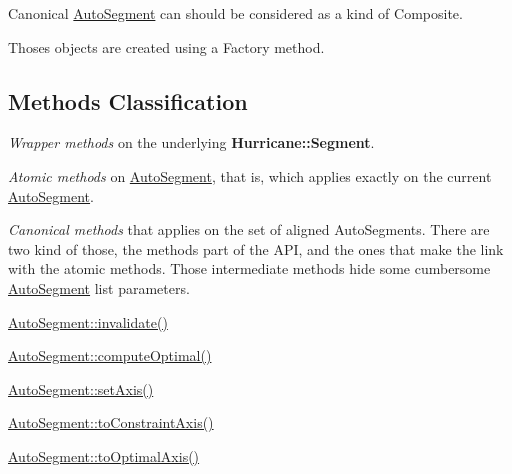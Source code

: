 Canonical \mbox{\hyperlink{classKatabatic_1_1AutoSegment}{Auto\+Segment}} can should be considered as a kind of Composite.

Thoses objects are created using a Factory method.\hypertarget{classKatabatic_1_1AutoSegment_secASMethodsClassif}{}\subsection{Methods Classification}\label{classKatabatic_1_1AutoSegment_secASMethodsClassif}

\begin{DoxyItemize}
\item {\itshape Wrapper methods} on the underlying \textbf{ Hurricane\+::\+Segment}. 
\end{DoxyItemize}
\begin{DoxyItemize}
\item {\itshape Atomic methods} on \mbox{\hyperlink{classKatabatic_1_1AutoSegment}{Auto\+Segment}}, that is, which applies exactly on the current \mbox{\hyperlink{classKatabatic_1_1AutoSegment}{Auto\+Segment}}. 
\end{DoxyItemize}
\begin{DoxyItemize}
\item {\itshape Canonical methods} that applies on the set of aligned Auto\+Segments. There are two kind of those, the methods part of the A\+PI, and the ones that make the link with the atomic methods. Those intermediate methods hide some cumbersome \mbox{\hyperlink{classKatabatic_1_1AutoSegment}{Auto\+Segment}} list parameters. 
\begin{DoxyItemize}
\item \mbox{\hyperlink{classKatabatic_1_1AutoSegment_a23599eee5a07af377fbc8d47cda7e7b0}{Auto\+Segment\+::invalidate()}} 
\item \mbox{\hyperlink{classKatabatic_1_1AutoSegment_aa902247a1e967e52cc3ab087cd52b366}{Auto\+Segment\+::compute\+Optimal()}} 
\item \mbox{\hyperlink{classKatabatic_1_1AutoSegment_a3881efebb7510d9b22e5f89bcd418954}{Auto\+Segment\+::set\+Axis()}} 
\item \mbox{\hyperlink{classKatabatic_1_1AutoSegment_a8ab41a962e18810808f4f065863b5a73}{Auto\+Segment\+::to\+Constraint\+Axis()}} 
\item \mbox{\hyperlink{classKatabatic_1_1AutoSegment_a750983d7154c94b54537127a3a18e14b}{Auto\+Segment\+::to\+Optimal\+Axis()}} 
\end{DoxyItemize}
\end{DoxyItemize}
